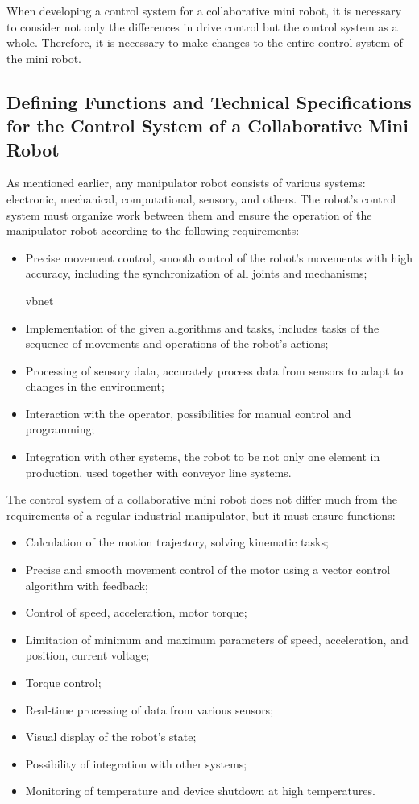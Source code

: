 When developing a control system for a collaborative mini robot, it is necessary to consider not only the differences in drive control but the control system as a whole. Therefore, it is necessary to make changes to the entire control system of the mini robot.

\subsection{Defining Functions and Technical Specifications for the Control System of a Collaborative Mini Robot}

As mentioned earlier, any manipulator robot consists of various systems: electronic, mechanical, computational, sensory, and others. The robot's control system must organize work between them and ensure the operation of the manipulator robot according to the following requirements:
\begin{itemize}
	\item Precise movement control, smooth control of the robot's movements with high accuracy, including the synchronization of all joints and mechanisms;

	      vbnet

	\item Implementation of the given algorithms and tasks, includes tasks of the sequence of movements and operations of the robot's actions;

	\item Processing of sensory data, accurately process data from sensors to adapt to changes in the environment;

	\item Interaction with the operator, possibilities for manual control and programming;

	\item Integration with other systems, the robot to be not only one element in production, used together with conveyor line systems.

\end{itemize}

The control system of a collaborative mini robot does not differ much from the requirements of a regular industrial manipulator, but it must ensure functions:
\begin{itemize}
	\item Calculation of the motion trajectory, solving kinematic tasks;
	\item Precise and smooth movement control of the motor using a vector control algorithm with feedback;
	\item Control of speed, acceleration, motor torque;
	\item Limitation of minimum and maximum parameters of speed, acceleration, and position, current voltage;
	\item Torque control;
	\item Real-time processing of data from various sensors;
	\item Visual display of the robot's state;
	\item Possibility of integration with other systems;
	\item Monitoring of temperature and device shutdown at high temperatures.
\end{itemize}

